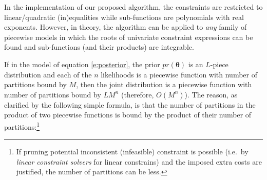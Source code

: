 In the implementation of our proposed algorithm, the constraints are restricted to linear/quadratic (in)equalities while sub-functions are polynomials with real exponents. %
However, in theory, the algorithm can be applied to \emph{any} family of piecewise models in which the roots of univariate constraint expressions can be found and sub-functions (and their products) are integrable. 




If in the model of equation \ref{e:posterior}, the prior $pr(\boldsymbol\theta)$ 
is an $L$-piece distribution and each of the $n$ likelihoods is a piecewise function with number of partitions  bound by $M$, 
then the joint distribution is a piecewise function with number of partitions bound by $LM^n$ (therefore, $O(M^n)$).
The reason, as clarified by the following simple formula,   
is that the number of partitions in the product of two piecewise functions is bound by the product of their number of partitions:\footnote{
If pruning potential inconsistent (infeasible) constraint is possible
(i.e.\ by \emph{linear constraint solvers} for linear constrains) and the imposed extra costs are justified,
the number of partitions can be less.
}%

